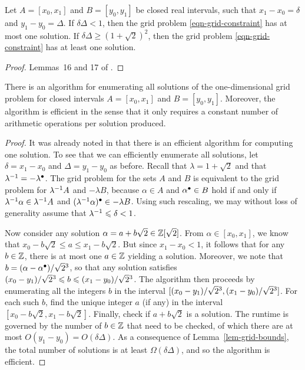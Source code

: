 \documentclass{article}
\begin{document}
\begin{lemma}\label{lem-grid-bounds}
  Let $A=[x_0,x_1]$ and $B=[y_0,y_1]$ be closed real intervals, such
  that $x_1-x_0=\delta$ and $y_1-y_0=\Delta$. If $\delta\Delta < 1$,
  then the grid problem {\eqref{eqn-grid-constraint}} has at most one
  solution. If $\delta\Delta \geq (1+\sqrt2)^2$, then the grid problem
  {\eqref{eqn-grid-constraint}} has at least one solution.
\end{lemma}

\begin{proof}
  Lemmas~16 and 17 of {\cite{Selinger-newsynth}}.
\end{proof}

\begin{proposition}\label{prop-algorithm-1d}
  There is an algorithm for enumerating all solutions of the
  one-dimensional grid problem for closed intervals $A=[x_0,x_1]$ and
  $B=[y_0,y_1]$. Moreover, the algorithm is efficient in the sense
  that it only requires a constant number of arithmetic operations per
  solution produced. 
\end{proposition}

\begin{proof}
  It was already noted in {\cite[Lemma~17]{Selinger-newsynth}} that there
  is an efficient algorithm for computing one solution. To see that we
  can efficiently enumerate all solutions, let $\delta=x_1-x_0$ and
  $\Delta=y_1-y_0$ as before.  Recall that $\lambda=1+\sqrt2$ and that 
  $\lambda^{-1}=-\lambda^{\bullet}$. The grid problem for the sets $A$ and
  $B$ is equivalent to the grid problem for $\lambda^{-1} A$ and
  $-\lambda B$, because $\alpha\in A$ and $\alpha^{\bullet}\in B$ hold if
  and only if $\lambda^{-1}\alpha\in\lambda^{-1} A$ and
  $(\lambda^{-1}\alpha)^{\bullet}\in-\lambda B$. Using such rescaling, we may
  without loss of generality assume that $\lambda^{-1}\leqslant \delta<1$.

  Now consider any solution $\alpha = a+b\sqrt 2\in\mathbb{Z}[\sqrt2]$. From
  $\alpha\in[x_0,x_1]$, we know that $x_0-b\sqrt 2 \leq a \leq
  x_1-b\sqrt 2$. But since $x_1-x_0<1$, it follows that for any
  $b\in\mathbb{Z}$, there is at most one $a\in\mathbb{Z}$ yielding a
  solution. Moreover, we note that $b=(\alpha-\alpha^{\bullet})/\sqrt{2}{}^{3}$, so
  that any solution satisfies $(x_0-y_1)/\sqrt{2}{}^{3} \leqslant b \leqslant
  (x_1-y_0)/\sqrt{2}{}^{3}$. The algorithm then proceeds by enumerating all
  the integers $b$ in the interval $[(x_0-y_1)/\sqrt{2}{}^{3},
  (x_1-y_0)/\sqrt{2}{}^{3}]$. For each such $b$, find the unique integer $a$
  (if any) in the interval $[x_0-b\sqrt 2, x_1-b\sqrt 2]$. Finally,
  check if $a+b\sqrt2$ is a solution. The runtime is
  governed by the number of $b\in\mathbb{Z}$ that need to be checked, of which
  there are at most $O(y_1-y_0) = O(\delta\Delta)$. As a consequence
  of Lemma~\ref{lem-grid-bounds}, the total number of solutions is
  at least $\Omega(\delta\Delta)$, and so the algorithm is efficient.
\end{proof}
\end{document}

